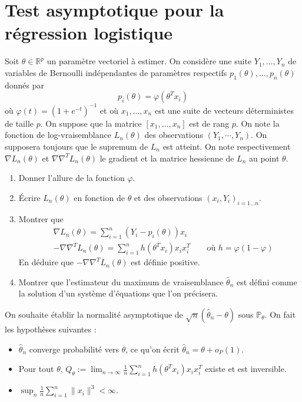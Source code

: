 \documentclass[a4paper,11pt,fleqn]{article}
\newcommand{\1}{\ensuremath{\mathbbm{1}}}
\begin{document}
\section{Test asymptotique pour la r\'egression logistique}

  Soit $\theta\in \mathbb R^p$ un param{\`e}tre vectoriel {\`a} estimer.
On consid{\`e}re une suite $Y_1,\dots,Y_n$ de variables de Bernoulli ind{\'e}pendantes de param{\`e}tres
respectifs $p_1(\theta),\dots,p_n(\theta)$ donn{\'e}s par
$$
p_i(\theta) = \varphi(\theta^T x_i)
$$
o{\`u} $\varphi(t) = (1+e^{-t})^{-1}$ et o{\`u} $x_1,\dots,x_n$ est une
suite de vecteurs d{\'e}terministes de taille $p$.  On suppose que la matrice
$[x_1,\dots,x_n]$ est de rang $p$.  On note la fonction de log-vraisemblance
$L_n(\theta)$ des observations $(Y_1, \cdots, Y_n)$.  On supposera toujours que
le supremum de $L_n$ est atteint.  On note respectivement $\nabla L_n(\theta)$
et $\nabla\nabla^T L_n(\theta)$ le gradient et la matrice hessienne de $L_n$ au
point $\theta$.
\begin{enumerate}
\item Donner l'allure de la fonction $\varphi$.
\item \'Ecrire $L_n(\theta)$ en fonction de $\theta$ et des observations $(x_i,Y_i)_{i=1\dots n}$.
\item Montrer que 
  \begin{align*}
    &  \nabla L_n(\theta) = \sum_{i=1}^n (Y_i-p_i(\theta))x_i \\
    & -\nabla\nabla^T L_n(\theta) = \sum_{i=1}^nh(\theta^Tx_i) x_ix_i^T \qquad
    \text{où \ } h=\varphi (1-\varphi)
  \end{align*}
  En d\'eduire que $-\nabla\nabla^T L_n(\theta)$ est d{\'e}finie positive.
\item Montrer que l'estimateur du maximum de vraisemblance $\hat \theta_n$ est
  d{\'e}fini comme la solution d'un syst{\`e}me d'{\'e}quations que l'on
  pr{\'e}cisera.
\end{enumerate}
On souhaite {\'e}tablir la normalit{\'e} asymptotique de $\sqrt
n(\hat\theta_n-\theta)$ sous $\mathbb P_\theta$.  On fait les hypoth{\`e}ses
suivantes :
\begin{itemize}[label=$\bullet$ ]
\item $\hat\theta_n$ converge probabilit\'e vers $\theta$, ce qu'on \'ecrit
  $\hat\theta_n=\theta+o_P(1)$.
\item Pour tout $\theta$, $Q_\theta:=\lim_{n\to\infty} \frac 1n\sum_{i=1}^n
  h(\theta^Tx_i) x_ix_i^T$ existe et est inversible.
\item  $\sup_n\frac 1n \sum_{i=1}^n \|x_i\|^{3}<\infty$.
\end{itemize}
\end{document}
